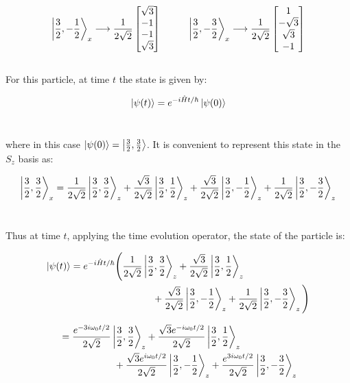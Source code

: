 \documentclass[14pt]{extarticle}
\begin{document}
$$
\ket{\frac 32 , -\frac 12}_x \longrightarrow \frac{1}{2\sqrt 2}
\begin{bmatrix}
        \sqrt 3 \\
        -1 \\
        -1 \\
        \sqrt 3
\end{bmatrix}
\hspace{1cm}
\ket{\frac 32 , -\frac 32}_x \longrightarrow \frac{1}{2\sqrt 2}
\begin{bmatrix}
        1 \\
        -\sqrt 3 \\
        \sqrt 3 \\
        -1
\end{bmatrix}
$$ \\ 

For this particle, at time $t$ the state is given by:

$$\ket{\psi(t)} = e^{-i\hat H t / \hbar} \ket{\psi(0)}$$ \

where in this case $\ket{\psi(0)} = \ket{\frac 32, \frac 32}$. It is convenient to represent this state in the $S_z$ basis as:

$$
\ket{\frac 32 , \frac 32}_x = \frac{1}{2\sqrt 2} \ket{\frac 32, \frac 32}_z + \frac{\sqrt 3}{2\sqrt 2} \ket{\frac 32 , \frac 12}_z + \frac{\sqrt 3}{2\sqrt 2} \ket{\frac 32 , -\frac 12}_z + \frac{1}{2\sqrt 2} \ket{\frac 32 , -\frac 32}_z 
$$ \ 

Thus at time $t$, applying the time evolution operator, the state of the particle is:

$$
\begin{aligned}
	\ket{\psi(t)} &= e^{-i\hat H t / \hbar} \Bigg( \frac{1}{2\sqrt 2} \ket{\frac 32, \frac 32}_z + \frac{\sqrt 3}{2\sqrt 2} \ket{\frac 32 , \frac 12}_z \\ 
	&\hspace{3cm} + \frac{\sqrt 3}{2\sqrt 2} \ket{\frac 32 , -\frac 12}_z + \frac{1}{2\sqrt 2} \ket{\frac 32 , -\frac 32}_z \Bigg)
\end{aligned}
$$

$$
\begin{aligned}
	&= \frac{e^{-3i \omega_0 t / 2}}{2\sqrt 2} \ket{\frac 32, \frac 32}_z + \frac{\sqrt 3 e^{-i \omega_0 t / 2}}{2\sqrt 2} \ket{\frac 32 , \frac 12}_z \\ 
	&\hspace{2cm} + \frac{\sqrt 3 e^{i \omega_0 t / 2}}{2\sqrt 2} \ket{\frac 32 , -\frac 12}_z + \frac{e^{3i \omega_0 t / 2}}{2\sqrt 2} \ket{\frac 32, -\frac 32}_z
\end{aligned}
$$ \ 
\end{document}
